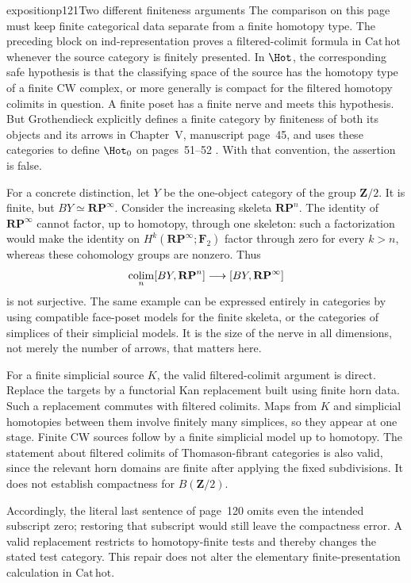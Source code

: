 \begin{dcomment}{exposition}{p121}{Two different finiteness arguments}
The comparison on this page must keep finite categorical data separate from a finite homotopy type. The preceding block on ind-representation proves a filtered-colimit formula in $\mathrm{Cat\,hot}$ whenever the source category is finitely presented. In $\Hot$, the corresponding safe hypothesis is that the classifying space of the source has the homotopy type of a finite CW complex, or more generally is compact for the filtered homotopy colimits in question. A finite poset has a finite nerve and meets this hypothesis. But Grothendieck explicitly defines a finite category by finiteness of both its objects and its arrows in Chapter~V, manuscript page~45, and uses these categories to define $\Hot_0$ on pages~51--52 \citep{Grothendieck1990V}. With that convention, the assertion is false.

For a concrete distinction, let $Y$ be the one-object category of the group $\mathbf Z/2$. It is finite, but $BY\simeq\mathbf{RP}^{\infty}$. Consider the increasing skeleta $\mathbf{RP}^n$. The identity of $\mathbf{RP}^{\infty}$ cannot factor, up to homotopy, through one skeleton: such a factorization would make the identity on $H^k(\mathbf{RP}^{\infty};\mathbf F_2)$ factor through zero for every $k>n$, whereas these cohomology groups are nonzero. Thus
\[
 \mathop{\rm colim}_n[BY,\mathbf{RP}^n]
       \longrightarrow[BY,\mathbf{RP}^{\infty}]
\]
is not surjective. The same example can be expressed entirely in categories by using compatible face-poset models for the finite skeleta, or the categories of simplices of their simplicial models. It is the size of the nerve in all dimensions, not merely the number of arrows, that matters here.

For a finite simplicial source $K$, the valid filtered-colimit argument is direct. Replace the targets by a functorial Kan replacement built using finite horn data. Such a replacement commutes with filtered colimits. Maps from $K$ and simplicial homotopies between them involve finitely many simplices, so they appear at one stage. Finite CW sources follow by a finite simplicial model up to homotopy. The statement about filtered colimits of Thomason-fibrant categories is also valid, since the relevant horn domains are finite after applying the fixed subdivisions. It does not establish compactness for $B(\mathbf Z/2)$.

Accordingly, the literal last sentence of page~120 omits even the intended subscript zero; restoring that subscript would still leave the compactness error. A valid replacement restricts to homotopy-finite tests and thereby changes the stated test category. This repair does not alter the elementary finite-presentation calculation in $\mathrm{Cat\,hot}$.
\end{dcomment}

